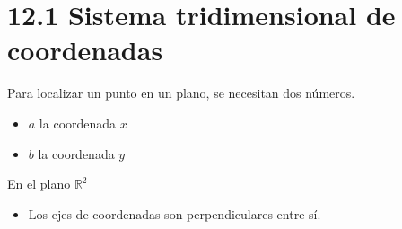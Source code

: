 % 
% 


\section{12.1 Sistema tridimensional de coordenadas}
Para localizar un punto en un plano, se necesitan dos números. 
\begin{itemize}
    \item $a$ la coordenada $x$ 
    \item $b$ la coordenada $y$ 
\end{itemize}
En el plano $\displaystyle \mathbb{R}^2$ 

\begin{itemize}
    \item Los ejes de coordenadas son perpendiculares entre sí.
\end{itemize}

